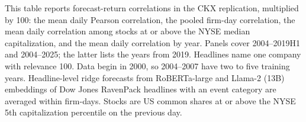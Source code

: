 \begin{table}[htbp]
\centering
\caption{CKX Replication: Return Prediction Correlations}
\label{tab:tabR1_ckx_corr}
\begin{minipage}{\linewidth}\footnotesize
This table reports forecast-return correlations in the CKX replication, multiplied by 100: the mean daily Pearson correlation, the pooled firm-day correlation, the mean daily correlation among stocks at or above the NYSE median capitalization, and the mean daily correlation by year. Panels cover 2004--2019H1 and 2004--2025; the latter lists the years from 2019. Headlines name one company with relevance 100. Data begin in 2000, so 2004--2007 have two to five training years. Headline-level ridge forecasts from RoBERTa-large and Llama-2 (13B) embeddings of Dow Jones RavenPack headlines with an event category are averaged within firm-days. Stocks are US common shares at or above the NYSE 5th capitalization percentile on the previous day.
\end{minipage}
\medskip


\end{table}
